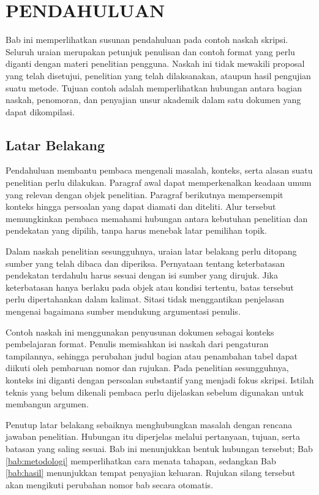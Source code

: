 \chapter{PENDAHULUAN}
\label{bab:pendahuluan}

Bab ini memperlihatkan susunan pendahuluan pada contoh naskah skripsi. Seluruh uraian merupakan petunjuk penulisan dan contoh format yang perlu diganti dengan materi penelitian pengguna. Naskah ini tidak mewakili proposal yang telah disetujui, penelitian yang telah dilaksanakan, ataupun hasil pengujian suatu metode. Tujuan contoh adalah memperlihatkan hubungan antara bagian naskah, penomoran, dan penyajian unsur akademik dalam satu dokumen yang dapat dikompilasi.

\section{Latar Belakang}

Pendahuluan membantu pembaca mengenali masalah, konteks, serta alasan suatu penelitian perlu dilakukan. Paragraf awal dapat memperkenalkan keadaan umum yang relevan dengan objek penelitian. Paragraf berikutnya mempersempit konteks hingga persoalan yang dapat diamati dan diteliti. Alur tersebut memungkinkan pembaca memahami hubungan antara kebutuhan penelitian dan pendekatan yang dipilih, tanpa harus menebak latar pemilihan topik.

Dalam naskah penelitian sesungguhnya, uraian latar belakang perlu ditopang sumber yang telah dibaca dan diperiksa. Pernyataan tentang keterbatasan pendekatan terdahulu harus sesuai dengan isi sumber yang dirujuk. Jika keterbatasan hanya berlaku pada objek atau kondisi tertentu, batas tersebut perlu dipertahankan dalam kalimat. Sitasi tidak menggantikan penjelasan mengenai bagaimana sumber mendukung argumentasi penulis.

Contoh naskah ini menggunakan penyusunan dokumen sebagai konteks pembelajaran format. Penulis memisahkan isi naskah dari pengaturan tampilannya, sehingga perubahan judul bagian atau penambahan tabel dapat diikuti oleh pembaruan nomor dan rujukan. Pada penelitian sesungguhnya, konteks ini diganti dengan persoalan substantif yang menjadi fokus skripsi. Istilah teknis yang belum dikenali pembaca perlu dijelaskan sebelum digunakan untuk membangun argumen.

Penutup latar belakang sebaiknya menghubungkan masalah dengan rencana jawaban penelitian. Hubungan itu diperjelas melalui pertanyaan, tujuan, serta batasan yang saling sesuai. Bab ini menunjukkan bentuk hubungan tersebut; Bab \ref{bab:metodologi} memperlihatkan cara menata tahapan, sedangkan Bab \ref{bab:hasil} menunjukkan tempat penyajian keluaran. Rujukan silang tersebut akan mengikuti perubahan nomor bab secara otomatis.

